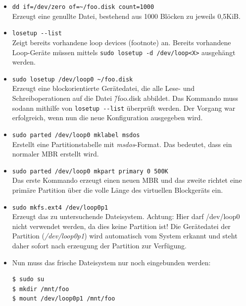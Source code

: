 \documentclass[11pt,a4paper]{article}
\def\inlinebash{\lstinline[style=bash]}
\begin{document}
\begin{itemize}
\item \inlinebash$dd if=/dev/zero of=~/foo.disk count=1000$\\
	Erzeugt eine genullte Datei, bestehend aus 1000 Blöcken zu jeweils 0,5KiB.

\item \inlinebash$losetup --list$\\
	Zeigt bereits vorhandene loop devices (footnote) an. Bereits vorhandene Loop-Geräte
	müssen mittels \inlinebash$sudo losetup -d /dev/loop<X>$ ausgehängt werden. 

\item \inlinebash$sudo losetup /dev/loop0 ~/foo.disk$\\
	Erzeugt eine blockorientierte Gerätedatei, die alle Lese- und Schreiboperationen
	auf die Datei \~/foo.disk abbildet. Das Kommando muss sodann mithilfe von
	\inlinebash$losetup --list$ überprüft werden. Der Vorgang war erfolgreich, 
	wenn nun die neue Konfiguration ausgegeben wird.

\item \inlinebash$sudo parted /dev/loop0 mklabel msdos$\\
	Erstellt eine Partitionstabelle mit \emph{msdos}-Format. Das bedeutet, dass
	ein normaler MBR erstellt wird.
	
\item \inlinebash$sudo parted /dev/loop0 mkpart primary 0 500K$\\
	Das erste Kommando erzeugt einen neuen MBR und das zweite
	richtet eine primäre Partition über die volle Länge des
	virtuellen Blockgeräts ein.

\item \inlinebash$sudo mkfs.ext4 /dev/loop0p1$\\
	Erzeugt das zu untersuchende Dateisystem. Achtung: Hier darf
	/dev/loop0 nicht verwendet werden, da dies keine Partition ist!
	Die Gerätedatei der Partition (\emph{/dev/loop0p1}) wird automatisch
	vom System erkannt und steht daher sofort nach erzeugung der
	Partition zur Verfügung.

\item
Nun muss das frische Dateisystem nur noch eingebunden werden:

\begin{lstlisting}[style=bash]
$ sudo su
$ mkdir /mnt/foo
$ mount /dev/loop0p1 /mnt/foo
\end{lstlisting}
\end{itemize}
\end{document}
